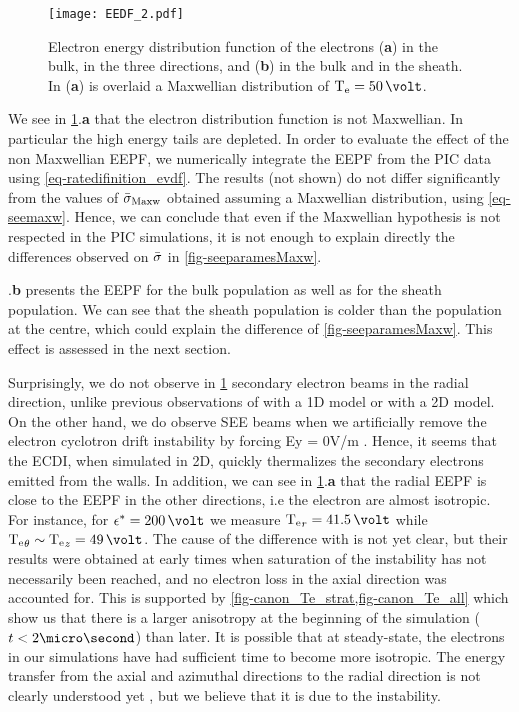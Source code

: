      \begin{figure}[hbtp]
       \centering
       \texttt{[image: EEDF\_2.pdf]}
       \caption{Electron energy distribution function of the electrons ({\bf a}) in the bulk, in the three directions, and ({\bf b}) in the bulk and in the sheath. In ({\bf a}) is overlaid a Maxwellian distribution of $\Te=50\,\volt$. }
       \label{fig-EEDF}
     \end{figure}
     
    We see in \cref{fig-EEDF}.{\bf a} that the electron distribution function is not Maxwellian.
    In particular the high energy tails are depleted.
    In order to evaluate the effect of the non Maxwellian EEPF, we numerically integrate the EEPF from the PIC data using \cref{eq-ratedifinition_evdf}.
    The results (not shown) do not differ significantly from the values of $ \bar{\sigma }_{\rm Maxw}$ obtained assuming a Maxwellian distribution, using \cref{eq-seemaxw}.
    Hence, we can conclude that even if the Maxwellian hypothesis is not respected in the PIC simulations, it is not enough to explain directly the differences observed on $ \bar{\sigma }$ in \cref{fig-seeparamesMaxw}.


    .{\bf b} presents the EEPF for the bulk population as well as for the sheath population.
    We can see that the sheath population is colder than the population at the centre, which could explain the difference of \cref{fig-seeparamesMaxw}. 
    This effect is assessed in the next section.

     Surprisingly, we do not observe in \cref{fig-EEDF} secondary electron beams in the radial  direction, unlike previous observations of \citet{sydorenko2006} with a 1D model or \citet{heron2013} with a 2D model.
     On the other hand, we do observe SEE beams when  we artificially remove the electron cyclotron drift instability by forcing Ey = 0V/m \citep{croes2017}.
     Hence, it seems that the ECDI, when simulated in 2D, quickly thermalizes the secondary electrons emitted from the walls.
     In addition, we can see in \cref{fig-EEDF}.{\bf a} that the radial EEPF is close to the EEPF in the other directions, i.e the electron are almost isotropic.
     For instance, for $\crover = 200\,\volt$  we measure $\Te_r = 41.5\,\volt$ while $\Te_{\theta} \sim \Te_z = 49\,\volt$.
     The cause of the difference with \citet{heron2013} is not yet clear, but their results were  obtained at early times when saturation of the instability has not necessarily been reached, and no electron loss in  the axial direction was accounted for.
     This is supported by \cref{fig-canon_Te_strat,fig-canon_Te_all} which show us that there is a larger anisotropy at the beginning of the simulation ($t<2\micro\second$) than later.
     It is possible that at steady-state, the electrons in our simulations have had sufficient time to become more isotropic.
     The energy transfer from the axial and azimuthal directions to the radial direction is not clearly understood
     yet \citep{janhunen2018}, but we believe that it is due to the instability.



